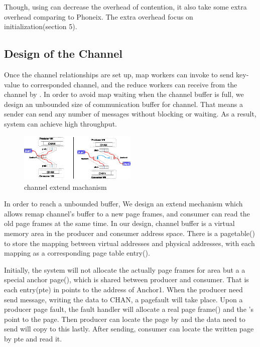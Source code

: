 Though, using \myth can decrease the overhead of contention,
it also take some extra overhead comparing to Phoneix. 
The extra overhead focus on initialization(section 5). 


\subsection{Design of the Channel}
Once the channel relationships are set up, 
map workers can invoke  to send key-value to corresponded channel,
and the reduce workers can receive from the channel by .
In order to avoid map waiting when the channel buffer is full,
we design an unbounded size of communication buffer for channel.
That means a sender can send any number of messages without blocking or waiting.
As a result, system can achieve high throughput.


\begin{figure}[!h!t]  
	\centering
	\includegraphics[width=0.5\textwidth]{eps/chan_extend.eps}
	\caption{channel extend machanism}
	\label{fig:spmckern:extend}
\end{figure}
In order to reach a unbounded buffer,
We design an extend mechanism 
which allows remap channel’s buffer to a new page frames,
and consumer can read the old page frames at the same time.
In our design, channel buffer is a virtual memory area 
in the producer and consumer address space.
There is a pagetable() to store the mapping between virtual addresses and physical addresses, with each mapping as a corresponding page table entry().

Initially, the system will not allocate the actually page frames for  area but a a special anchor page(),
which is shared between producer and consumer.
That is each entry(pte) in  points to the address of Anchor1.
When the producer need send message, 
writing the data to CHAN, a pagefault will take place.
Upon a producer page fault, the fault handler will allocate a real page frame() and the 's  point to the page. 
Then producer can locate the page by  and the data need to send will copy to this  lastly.
After sending, consumer can locate the written page by pte 
and read it.

